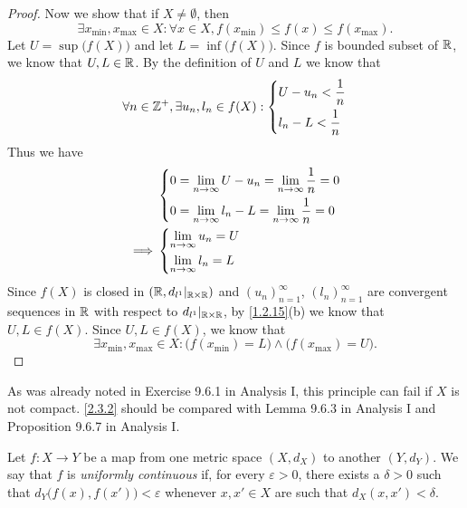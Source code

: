 \begin{proof}
  Now we show that if \(X \neq \emptyset\), then
  \[
    \exists x_{\min}, x_{\max} \in X : \forall x \in X, f(x_{\min}) \leq f(x) \leq f(x_{\max}).
  \]
  Let \(U = \sup\big(f(X)\big)\) and let \(L = \inf\big(f(X)\big)\).
  Since \(f\) is bounded subset of \(\mathbb{R}\), we know that \(U, L \in \mathbb{R}\).
  By the definition of \(U\) and \(L\) we know that
  \[
    \forall n \in \mathbb{Z}^+, \exists u_n, l_n \in f(X) : \begin{dcases}
      U - u_n < \dfrac{1}{n} \\
      l_n - L < \dfrac{1}{n}
    \end{dcases}
  \]
  Thus we have
  \begin{align*}
             & \begin{dcases}
                 0 = \lim_{n \to \infty} U - u_n = \lim_{n \to \infty} \dfrac{1}{n} = 0 \\
                 0 = \lim_{n \to \infty} l_n - L = \lim_{n \to \infty} \dfrac{1}{n} = 0
               \end{dcases} \\
    \implies & \begin{dcases}
                 \lim_{n \to \infty} u_n = U \\
                 \lim_{n \to \infty} l_n = L
               \end{dcases}
  \end{align*}
  Since \(f(X)\) is closed in \((\mathbb{R}, d_{l^1}|_{\mathbb{R} \times \mathbb{R}})\) and \((u_n)_{n = 1}^\infty\), \((l_n)_{n = 1}^\infty\) are convergent sequences in \(\mathbb{R}\) with respect to \(d_{l^1}|_{\mathbb{R} \times \mathbb{R}}\), by \cref{1.2.15}(b) we know that \(U, L \in f(X)\).
  Since \(U, L \in f(X)\), we know that
  \[
    \exists x_{\min}, x_{\max} \in X : \big(f(x_{\min}) = L\big) \land \big(f(x_{\max}) = U\big).
  \]
\end{proof}

\begin{rmk}\label{2.3.3}
  As was already noted in Exercise 9.6.1 in Analysis I, this principle can fail if \(X\) is not compact.
  \cref{2.3.2} should be compared with Lemma 9.6.3 in Analysis I and Proposition 9.6.7 in Analysis I.
\end{rmk}

\begin{defn}\label{2.3.4}
  Let \(f : X \to Y\) be a map from one metric space \((X, d_X)\) to another \((Y, d_Y)\).
  We say that \(f\) is \emph{uniformly continuous} if, for every \(\varepsilon > 0\), there exists a \(\delta > 0\) such that \(d_Y\big(f(x), f(x')\big) < \varepsilon\) whenever \(x, x' \in X\) are such that \(d_X(x, x') < \delta\).
\end{defn}

